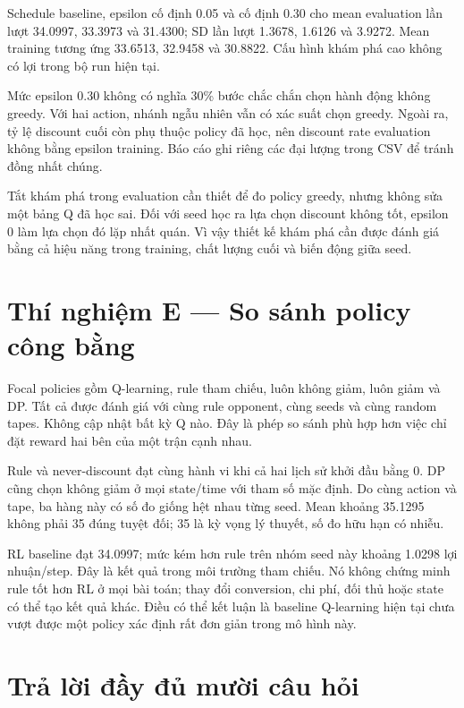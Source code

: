 Schedule baseline, epsilon cố định 0.05 và cố định 0.30 cho mean
evaluation lần lượt 34.0997, 33.3973 và 31.4300; SD lần lượt 1.3678,
1.6126 và 3.9272. Mean training tương ứng 33.6513, 32.9458 và 30.8822.
Cấu hình khám phá cao không có lợi trong bộ run hiện tại.

Mức epsilon 0.30 không có nghĩa 30\% bước chắc chắn chọn hành động không
greedy. Với hai action, nhánh ngẫu nhiên vẫn có xác suất chọn greedy.
Ngoài ra, tỷ lệ discount cuối còn phụ thuộc policy đã học, nên discount
rate evaluation không bằng epsilon training. Báo cáo ghi riêng các đại
lượng trong CSV để tránh đồng nhất chúng.

Tắt khám phá trong evaluation cần thiết để đo policy greedy, nhưng không
sửa một bảng Q đã học sai. Đối với seed học ra lựa chọn discount không
tốt, epsilon 0 làm lựa chọn đó lặp nhất quán. Vì vậy thiết kế khám phá
cần được đánh giá bằng cả hiệu năng trong training, chất lượng cuối và
biến động giữa seed.

\section{Thí nghiệm E --- So sánh policy công
bằng}\label{thuxed-nghiux1ec7m-e-so-suxe1nh-policy-cuxf4ng-bux1eb1ng}

Focal policies gồm Q-learning, rule tham chiếu, luôn không giảm, luôn
giảm và DP. Tất cả được đánh giá với cùng rule opponent, cùng seeds và
cùng random tapes. Không cập nhật bất kỳ Q nào. Đây là phép so sánh phù
hợp hơn việc chỉ đặt reward hai bên của một trận cạnh nhau.

Rule và never-discount đạt cùng hành vi khi cả hai lịch sử khởi đầu bằng
0. DP cũng chọn không giảm ở mọi state/time với tham số mặc định. Do
cùng action và tape, ba hàng này có số đo giống hệt nhau từng seed. Mean
khoảng 35.1295 không phải 35 đúng tuyệt đối; 35 là kỳ vọng lý thuyết, số
đo hữu hạn có nhiễu.

RL baseline đạt 34.0997; mức kém hơn rule trên nhóm seed này khoảng
1.0298 lợi nhuận/step. Đây là kết quả trong môi trường tham chiếu. Nó
không chứng minh rule tốt hơn RL ở mọi bài toán; thay đổi conversion,
chi phí, đối thủ hoặc state có thể tạo kết quả khác. Điều có thể kết
luận là baseline Q-learning hiện tại chưa vượt được một policy xác định
rất đơn giản trong mô hình này.

\section{Trả lời đầy đủ mười câu
hỏi}\label{trux1ea3-lux1eddi-ux111ux1ea7y-ux111ux1ee7-mux1b0ux1eddi-cuxe2u-hux1ecfi}

